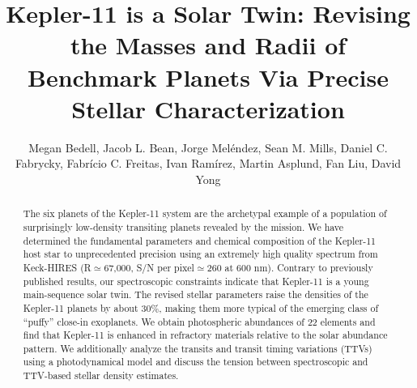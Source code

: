 \documentclass[oneside]{emulateapj}
\begin{document}
\graphicspath{ {figures/} }

\title{Kepler-11 is a Solar Twin: Revising the Masses and Radii of Benchmark Planets Via Precise Stellar Characterization}

\author{Megan Bedell,
Jacob L. Bean,
Jorge Mel\'{e}ndez,
Sean M. Mills,
Daniel C. Fabrycky,
Fabr\'{i}cio C. Freitas,
Ivan Ram\'{i}rez,
Martin Asplund,
Fan Liu,
David Yong}





\begin{abstract}

The six planets of the Kepler-11 system are the archetypal example of a population of surprisingly low-density transiting planets revealed by the \Kepler mission. We have determined the fundamental parameters and chemical composition of the Kepler-11 host star to unprecedented precision using an extremely high quality spectrum from Keck-HIRES (R$\simeq$67,000, S/N per pixel$\simeq$260 at 600 nm). Contrary to previously published results, our spectroscopic constraints indicate that Kepler-11 is a young main-sequence solar twin. The revised stellar parameters raise the densities of the Kepler-11 planets by about 30\%, making them more typical of the emerging class of ``puffy'' close-in exoplanets. We obtain photospheric abundances of 22 elements and find that Kepler-11 is enhanced in refractory materials relative to the solar abundance pattern. We additionally analyze the \Kepler transits and transit timing variations (TTVs) using a photodynamical model and discuss the tension between spectroscopic and TTV-based stellar density estimates.

\end{abstract}
\end{document}
